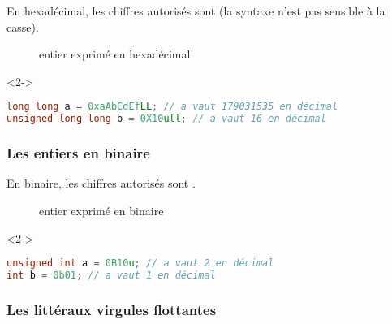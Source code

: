 \documentclass{cppcourses}
\begin{document}
\begin{frame}[fragile]

En hexadécimal, les chiffres autorisés sont  (la syntaxe n'est pas sensible à la casse).

\begin{figure}
\caption{entier exprimé en hexadécimal}
\end{figure}

\begin{example}<2->

\begin{lstlisting}[language = c++]
long long a = 0xaAbCdEfLL; // a vaut 179031535 en décimal
unsigned long long b = 0X10ull; // a vaut 16 en décimal
\end{lstlisting}

\end{example}

\end{frame}

\begin{frame}[fragile]

\frametitle{Les entiers en binaire}

En binaire, les chiffres autorisés sont .

\begin{figure}
\caption{entier exprimé en binaire}
\end{figure}

\begin{example}<2->

\begin{lstlisting}[language = c++]
unsigned int a = 0B10u; // a vaut 2 en décimal
int b = 0b01; // a vaut 1 en décimal
\end{lstlisting}

\end{example}

\end{frame}

\subsubsection{Les littéraux virgules flottantes}
\end{document}
